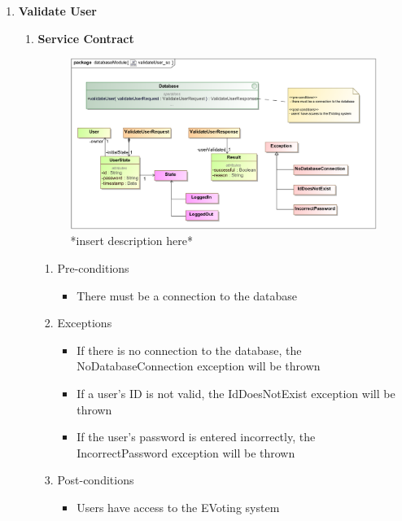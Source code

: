 \begin{enumerate}
	\item \textbf{Validate User}
		\begin{enumerate}
			\item \textbf{Service Contract}
				\begin{figure}[H]
					\centering
					\includegraphics[width=0.75\linewidth]{../Images/Database/ServiceContracts/ValidateUser_ServiceContract.png}
					\caption{*insert description here*}
				\end{figure}
				
				\begin{enumerate}
					\item Pre-conditions
					\begin{itemize}
						\item There must be a connection to the database
					\end{itemize}
					
					\item Exceptions
					\begin{itemize}
						\item If there is no connection to the database, the NoDatabaseConnection exception will be thrown
						\item If a user's ID is not valid, the IdDoesNotExist exception will be thrown
						\item If the user's password is entered incorrectly, the IncorrectPassword exception will be thrown
					\end{itemize}
					
					\item Post-conditions
					\begin{itemize}
						\item Users have access to the EVoting system
					\end{itemize}
				\end{enumerate}
			

\end{enumerate}
\end{enumerate}
